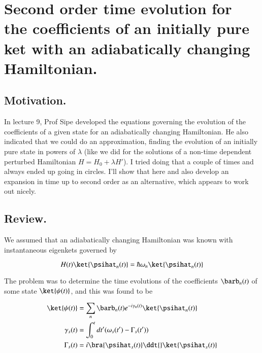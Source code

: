 %
%

\chapter{Second order time evolution for the coefficients of an initially pure ket with an adiabatically changing Hamiltonian.}
\label{chap:adiabaticApprox}
{}
\date{Nov 11, 2011}

\beginArtWithToc

\section{Motivation.}

In lecture 9, Prof Sipe developed the equations governing the evolution of the coefficients of a given state for an adiabatically changing Hamiltonian.  He also indicated that we could do an approximation, finding the evolution of an initially pure state in powers of $\lambda$ (like we did for the solutions of a non-time dependent perturbed Hamiltonian $H = H_0 + \lambda H'$).  I tried doing that a couple of times and always ended up going in circles.  I'll show that here and also develop an expansion in time up to second order as an alternative, which appears to work out nicely.

\section{Review.}

We assumed that an adiabatically changing Hamiltonian was known with instantaneous eigenkets governed by

\begin{equation}\label{eqn:adiabaticApprox:10}
H(t) \ket{\psihat_n(t)} = \hbar \omega_n \ket{\psihat_n(t)} 
\end{equation}

The problem was to determine the time evolutions of the coefficients $\barb_n(t)$ of some state $\ket{\psi(t)}$, and this was found to be

\begin{align}\label{eqn:adiabaticApprox:30}
\ket{\psi(t)} &= \sum_n \barb_n(t) e^{-i \gamma_n(t)} \ket{\psihat_n(t)} \\
\gamma_s(t) &= \int_0^t dt' (\omega_s(t') - \Gamma_s(t')) \\
\Gamma_s(t) &= i \bra{\psihat_s(t)} \ddt{} \ket{\psihat_s(t)} 
\end{align}

